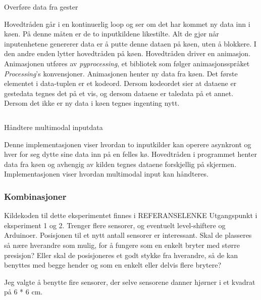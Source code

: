 \begin{listing}[ht]
\inputminted[fontsize=\footnotesize, linenos]{python}{kodesnutter/gesture_data.py}
\label{code:gesturedata}
\caption{Overføre data fra gester}
\end{listing}

Hovedtråden går i en kontinuerlig loop og ser om det har kommet ny data inn i køen. På denne måten er de to inputkildene likestilte. Alt de gjør når inputenhetene genererer data er å putte denne dataen på køen, uten å blokkere. I den andre enden lytter hovedtråden på køen. Hovedtråden driver en animasjon. Animasjonen utføres av \emph{pyprocessing}, et bibliotek som følger animasjonsspråket \emph{Processing}'s konvensjoner. Animasjonen henter ny data fra køen. Det første elementet i data-tuplen er et kodeord. Dersom kodeordet sier at dataene er gestedata tegnes det på et vis, og dersom dataene er taledata på et annet. Dersom det ikke er ny data i køen tegnes ingenting nytt.

\begin{listing}[ht]
\inputminted[fontsize=\footnotesize, linenos]{python}{kodesnutter/multimodal.py}
\label{code:multimodal}
\caption{Håndtere multimodal inputdata}
\end{listing}

Denne implementasjonen viser hvordan to inputkilder kan operere asynkront og hver for seg dytte sine data inn på en felles kø. Hovedtråden i programmet henter data fra køen og avhengig av kilden tegnes dataene forskjellig på skjermen. Implementasjonen viser hvordan multimodal input kan håndteres.

\subsubsection{Kombinasjoner}
{\color{red}Kildekoden til dette eksperimentet finnes i REFERANSELENKE}
Utgangspunkt i eksperiment 1 og 2. Trenger flere sensorer, og eventuelt level-shiftere og Arduinoer. Posisjonen til et nytt antall sensorer er interessant. Skal de plasseres så nære hverandre som mulig, for å fungere som en enkelt bryter med større presisjon? Eller skal de posisjoneres et godt stykke fra hverandre, så de kan benyttes med begge hender og som en enkelt eller delvis flere brytere?

Jeg valgte å benytte fire sensorer, der selve sensorene danner hjørner i et kvadrat på 6 * 6 cm.

